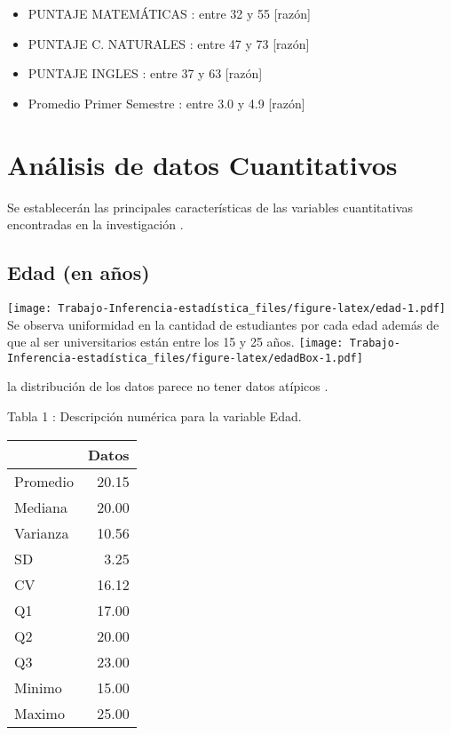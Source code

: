 \documentclass[
  man]{apa6}
\begin{document}
\begin{itemize}

  \item PUNTAJE MATEMÁTICAS : entre  32 y 55 [razón]
  \item PUNTAJE C. NATURALES : entre 47 y 73 [razón]
  \item PUNTAJE INGLES : entre 37 y 63 [razón]
  \item Promedio Primer Semestre : entre 3.0  y 4.9 [razón]
  
\end{itemize}

\hypertarget{anuxe1lisis-de-datos-cuantitativos}{%
\section{Análisis de datos Cuantitativos}\label{anuxe1lisis-de-datos-cuantitativos}}

Se establecerán las principales características de las variables
cuantitativas encontradas en la investigación .

\hypertarget{edad-en-auxf1os}{%
\subsection{Edad (en años)}\label{edad-en-auxf1os}}

\texttt{[image: Trabajo-Inferencia-estadística\_files/figure-latex/edad-1.pdf]}
Se observa uniformidad en la cantidad de estudiantes por cada edad
además de que al ser universitarios están entre los 15 y 25 años.
\texttt{[image: Trabajo-Inferencia-estadística\_files/figure-latex/edadBox-1.pdf]}

la distribución de los datos parece no tener datos atípicos .

Tabla 1 : Descripción numérica para la variable Edad.

\begin{center}

\begin{tabular}{l|r}
\hline
  & Datos\\
\hline
Promedio & 20.15\\
\hline
Mediana & 20.00\\
\hline
Varianza & 10.56\\
\hline
SD & 3.25\\
\hline
CV & 16.12\\
\hline
Q1 & 17.00\\
\hline
Q2 & 20.00\\
\hline
Q3 & 23.00\\
\hline
Minimo & 15.00\\
\hline
Maximo & 25.00\\
\hline
\end{tabular}
\end{center}
\end{document}
